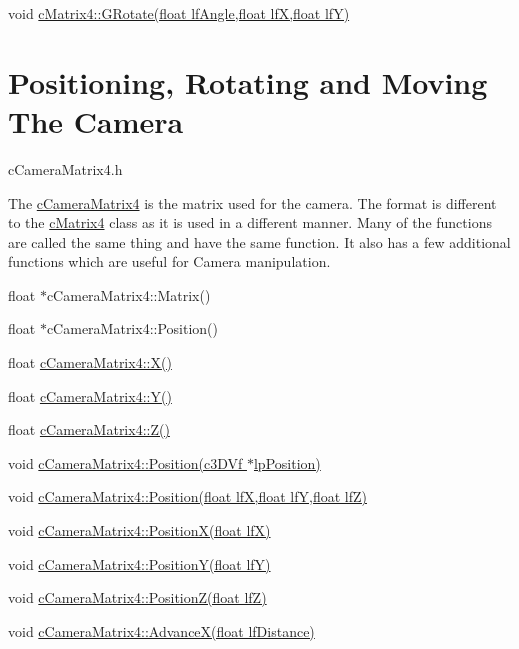  void \hyperlink{classc_matrix4_a5115db44a0c51d97be3d5791fb19d18a}{cMatrix4::GRotate(float lfAngle,float lfX,float lfY)} \par
\hypertarget{_reference_lists_CameraMatrixUsagePage}{}\section{Positioning, Rotating and Moving The Camera}\label{_reference_lists_CameraMatrixUsagePage}
cCameraMatrix4.h \par
 The \hyperlink{classc_camera_matrix4}{cCameraMatrix4} is the matrix used for the camera. The format is different to the \hyperlink{classc_matrix4}{cMatrix4} class as it is used in a different manner. Many of the functions are called the same thing and have the same function. It also has a few additional functions which are useful for Camera manipulation. \par
 \par
 float $\ast$cCameraMatrix4::Matrix() \par
 float $\ast$cCameraMatrix4::Position() \par
 \par
 float \hyperlink{classc_camera_matrix4_a0133c16b734fa93e767ea89964799fb5}{cCameraMatrix4::X()} \par
 float \hyperlink{classc_camera_matrix4_aec72cb78c62b2e0970824262b0b4aa1f}{cCameraMatrix4::Y()} \par
 float \hyperlink{classc_camera_matrix4_a7e3030fcedbd3b74270b26ea2b61904c}{cCameraMatrix4::Z()} \par
 \par
 void \hyperlink{classc_camera_matrix4_a7110b0f3aa924a2cfefe8ca149e0b41f}{cCameraMatrix4::Position(c3DVf $\ast$lpPosition)} \par
 void \hyperlink{classc_camera_matrix4_a1aa471464a30ce27fe339b743b840516}{cCameraMatrix4::Position(float lfX,float lfY,float lfZ)} \par
 void \hyperlink{classc_camera_matrix4_af130ddef040458f01b9a2365f41c567a}{cCameraMatrix4::PositionX(float lfX)} \par
 void \hyperlink{classc_camera_matrix4_adce3f6365faf3af907994f50c004c736}{cCameraMatrix4::PositionY(float lfY)} \par
 void \hyperlink{classc_camera_matrix4_a6ea814a92ce2d7fcc1ba66490127b2f2}{cCameraMatrix4::PositionZ(float lfZ)} \par
 \par
 void \hyperlink{classc_camera_matrix4_a4a07cdf5cb578378193487a1ac304380}{cCameraMatrix4::AdvanceX(float lfDistance)} \par
